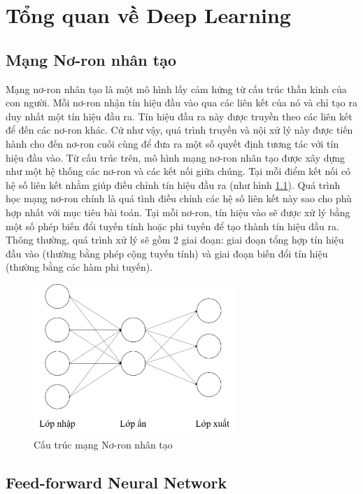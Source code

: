 \chapter{Tổng quan về Deep Learning}
\label{Chapter3}
\section{Mạng Nơ-ron nhân tạo}
Mạng nơ-ron nhân tạo là một mô hình lấy cảm hứng từ cấu trúc thần kinh của con người. Mỗi nơ-ron nhận tín hiệu đầu vào qua các liên kết của nó và chỉ tạo ra duy nhất một tín hiệu đầu ra. Tín hiệu đầu ra này được truyền theo các liên kết để đến các nơ-ron khác. Cứ như vậy, quá trình truyền và nội xử lý này được tiến hành cho đến nơ-ron cuối cùng để đưa ra một số quyết định tương tác với tín hiệu đầu vào. Từ cấu trúc trên, mô hình mạng nơ-ron nhân tạo được xây dựng như một hệ thống các nơ-ron và các kết nối giữa chúng. Tại mỗi điểm kết nối có hệ số liên kết nhằm giúp điều chỉnh tín hiệu đầu ra (như hình \ref{ANNStructures}). Quá trình học mạng nơ-ron chính là quá tình điều chỉnh các hệ số liên kết này sao cho phù hợp nhất với mục tiêu bài toán. Tại mỗi nơ-ron, tín hiệu vào sẽ được xử lý bằng một số phép biến đổi tuyến tính hoặc phi tuyến để tạo thành tín hiệu đầu ra. Thông thường, quá trình xử lý sẽ gồm 2 giai đoạn: giai đoạn tổng hợp tín hiệu đầu vào (thường bằng phép cộng tuyến tính) và giai đoạn biến đổi tín hiệu (thường bằng các hàm phi tuyến). \\


\begin{figure}[h]
	\centering
	\includegraphics[width=0.68\textwidth]{Chapter3/ANNStructures}
	\caption{Cấu trúc mạng Nơ-ron nhân tạo}
	\label{ANNStructures}
\end{figure}


\section{Feed-forward Neural Network}


